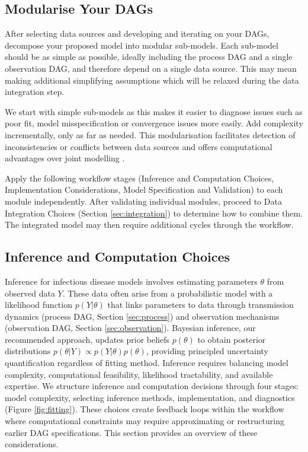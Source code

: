 \documentclass{article}
\begin{document}
\subsection{Modularise Your DAGs} \label{sec:modularise}

After selecting data sources and developing and iterating on your DAGs, decompose your proposed model into modular sub-models.
Each sub-model should be as simple as possible, ideally including the process DAG and a single observation DAG, and therefore depend on a single data source.
This may mean making additional simplifying assumptions which will be relaxed during the data integration step.

We start with simple sub-models as this makes it easier to diagnose issues such as poor fit, model misspecification or convergence issues more easily.
Add complexity incrementally, only as far as needed.
This modularisation facilitates detection of inconsistencies or conflicts between data sources \citep{presanis2013conflict,manderson2023combining} and offers computational advantages over joint modelling \citep{deangelis2018analysing,goudie2019joining,gelman2020bayesian,nicholson2022interoperability}.

Apply the following workflow stages (Inference and Computation Choices, Implementation Considerations, Model Specification and Validation) to each module independently.
After validating individual modules, proceed to Data Integration Choices (Section \ref{sec:integration}) to determine how to combine them.
The integrated model may then require additional cycles through the workflow.

\subsection{Inference and Computation Choices}\label{sec:fitting}

Inference for infectious disease models involves estimating parameters $\theta$ from observed data $Y$.
 These data often arise from a probabilistic model with a likelihood function $p(Y |
  \theta)$ that links parameters to data through transmission dynamics (process DAG, Section \ref{sec:process}) and observation mechanisms (observation DAG, Section \ref{sec:observation}).
Bayesian inference, our recommended approach, updates prior beliefs $p(\theta)$ to obtain posterior distributions $p(\theta | Y) \propto p(Y|\theta) p(\theta)$, providing principled uncertainty quantification regardless of fitting method.
Inference requires balancing model complexity, computational feasibility, likelihood tractability, and available expertise.
We structure inference and computation decisions through four stages: model complexity, selecting inference methods, implementation, and diagnostics (Figure \ref{fig:fitting}). 
These choices create feedback loops within the workflow where computational constraints may require approximating or restructuring earlier DAG specifications.
This section provides an overview of these considerations.
\end{document}
